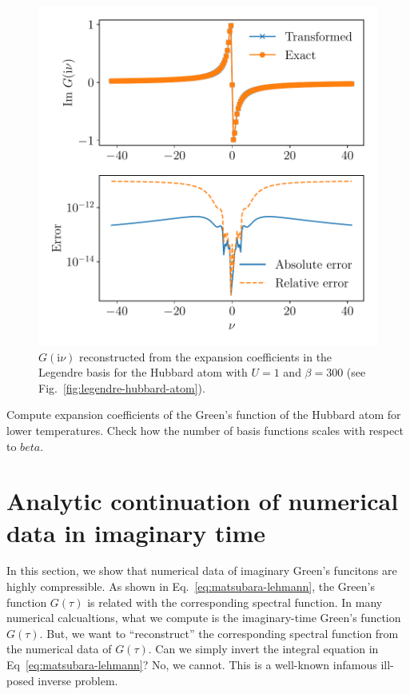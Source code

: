 \documentclass[submission, LectureNotes]{SciPost}
\newcommand\ii{\mathrm{i}}%
\newcommand\iv{\ii\nu}%
\begin{document}
\begin{figure}
    \centering
    \includegraphics[width=0.8\columnwidth]{legendre_matsu_hubbard_atom.pdf}
    \caption{
        $G(\iv)$ reconstructed from the expansion coefficients in the Legendre basis
        for the Hubbard atom with $U=1$ and $\beta=300$ (see Fig.~\ref{fig:legendre-hubbard-atom}).
        }
    \label{fig:legendre-matsu-hubbard-atom}
\end{figure}


\begin{Exercise}
    Compute expansion coefficients of the Green's function of the Hubbard atom
    for lower temperatures.
    Check how the number of basis functions scales with respect to $beta$.
\end{Exercise}



\clearpage
\section{Analytic continuation of numerical data in imaginary time}
In this section, we show that numerical data of imaginary Green's funcitons are highly compressible.
As shown in Eq.~\eqref{eq:matsubara-lehmann},
the Green's function $G(\tau)$ is related with the corresponding spectral function.
In many numerical calcualtions, what we compute is the imaginary-time Green's function $G(\tau)$.
But, we want to ``reconstruct'' the corresponding spectral function from the numerical data of $G(\tau)$.
Can we simply invert the integral equation in Eq~\eqref{eq:matsubara-lehmann}?
No, we cannot.
This is a well-known infamous ill-posed inverse problem.
\end{document}
